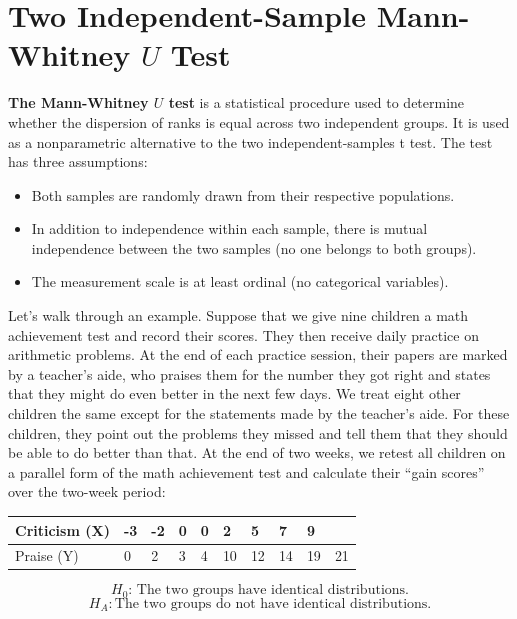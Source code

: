 \documentclass[
  letterpaper,
  DIV=11,
  numbers=noendperiod]{scrreprt}
\begin{document}
\section{\texorpdfstring{Two Independent-Sample Mann-Whitney \(U\)
Test}{Two Independent-Sample Mann-Whitney U Test}}\label{two-independent-sample-mann-whitney-u-test}

\textbf{The Mann-Whitney \(U\) test} is a statistical procedure used to
determine whether the dispersion of ranks is equal across two
independent groups. It is used as a nonparametric alternative to the two
independent-samples t test. The test has three assumptions:

\begin{itemize}
\item
  Both samples are randomly drawn from their respective populations.
\item
  In addition to independence within each sample, there is mutual
  independence between the two samples (no one belongs to both groups).
\item
  The measurement scale is at least ordinal (no categorical variables).
\end{itemize}

Let's walk through an example. Suppose that we give nine children a math
achievement test and record their scores. They then receive daily
practice on arithmetic problems. At the end of each practice session,
their papers are marked by a teacher's aide, who praises them for the
number they got right and states that they might do even better in the
next few days. We treat eight other children the same except for the
statements made by the teacher's aide. For these children, they point
out the problems they missed and tell them that they should be able to
do better than that. At the end of two weeks, we retest all children on
a parallel form of the math achievement test and calculate their ``gain
scores'' over the two-week period:

\begin{longtable}[]{@{}llllllllll@{}}
\toprule\noalign{}
Criticism (X) & -3 & -2 & 0 & 0 & 2 & 5 & 7 & 9 & \\
\midrule\noalign{}
\endhead
\bottomrule\noalign{}
\endlastfoot
Praise (Y) & 0 & 2 & 3 & 4 & 10 & 12 & 14 & 19 & 21 \\
\end{longtable}

\[
H_0 \text{: The two groups have identical distributions.} 
\] \[
H_A: \text{The two groups do not have identical distributions.} 
\]
\end{document}
